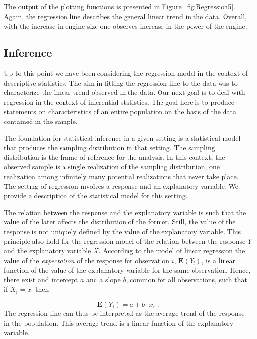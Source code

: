 \documentclass[]{krantz}
\newcommand{\Expec}{\mathbf{E}}
\theoremstyle{definition}
\theoremstyle{definition}
\theoremstyle{definition}
\theoremstyle{remark}
\begin{document}
The output of the plotting functions is presented in
Figure~\ref{fig:Regression5}. Again, the regression line describes the
general linear trend in the data. Overall, with the increase in engine
size one observes increase in the power of the engine.

\hypertarget{subsec:Inference}{%
\subsection{Inference}\label{subsec:Inference}}

Up to this point we have been considering the regression model in the
context of descriptive statistics. The aim in fitting the regression
line to the data was to characterize the linear trend observed in the
data. Our next goal is to deal with regression in the context of
inferential statistics. The goal here is to produce statements on
characteristics of an entire population on the basis of the data
contained in the sample.

The foundation for statistical inference in a given setting is a
statistical model that produces the sampling distribution in that
setting. The sampling distribution is the frame of reference for the
analysis. In this context, the observed sample is a single realization
of the sampling distribution, one realization among infinitely many
potential realizations that never take place. The setting of regression
involves a response and an explanatory variable. We provide a
description of the statistical model for this setting.

The relation between the response and the explanatory variable is such
that the value of the later affects the distribution of the former.
Still, the value of the response is not uniquely defined by the value of
the explanatory variable. This principle also hold for the regression
model of the relation between the response \(Y\) and the explanatory
variable \(X\). According to the model of linear regression the value of
the \emph{expectation} of the response for observation \(i\), \(\Expec(Y_i)\), is
a linear function of the value of the explanatory variable for the same
observation. Hence, there exist and intercept \(a\) and a slope \(b\),
common for all observations, such that if \(X_i = x_i\) then

\[\Expec(Y_i) = a + b \cdot x_i\;.\] The regression line can thus be
interpreted as the average trend of the response in the population. This
average trend is a linear function of the explanatory variable.
\end{document}
